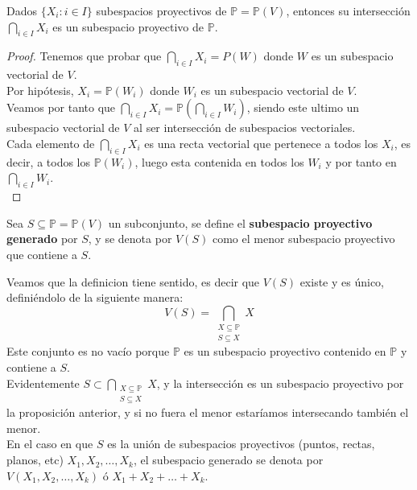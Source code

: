 \begin{proposición}
    Dados $\{X_i : i \in I\}$ subespacios proyectivos de $\mathbb{P} = \mathbb{P}(V)$, entonces su intersección $\bigcap_{i \in I} X_i$ es un subespacio proyectivo de $\mathbb{P}$.\\
\end{proposición}

\begin{proof}
    Tenemos que probar que $\bigcap_{i \in I} X_i = P(W)$ donde $W$ es un subespacio vectorial de $V$.\\
    Por hipótesis, $X_i = \mathbb{P}(W_i)$ donde $W_i$ es un subespacio vectorial de $V$.\\
    Veamos por tanto que $\bigcap_{i \in I} X_i = \mathbb{P}(\bigcap_{i \in I} W_i)$, siendo este ultimo un subespacio vectorial de $V$ al ser intersección de subespacios vectoriales.\\
    Cada elemento de $\bigcap_{i \in I} X_i$ es una recta vectorial que pertenece a todos los $X_i$, es decir, a todos los $\mathbb{P}(W_i)$, luego esta contenida en todos los $W_i$ y por tanto en $\bigcap_{i \in I} W_i$.\\
\end{proof}

\begin{definición}
    Sea $S \subseteq \mathbb{P} = \mathbb{P}(V)$ un subconjunto, se define el \textbf{subespacio proyectivo generado} por $S$, y se denota por $V(S)$ como el menor subespacio proyectivo que contiene a $S$.\\
\end{definición}

Veamos que la definicion tiene sentido, es decir que $V(S)$ existe y es único, definiéndolo de la siguiente manera:
\[
V(S) = \bigcap_{\substack{X \subseteq \mathbb{P} \\ S \subseteq X}} X
\]
Este conjunto es no vacío porque $\mathbb{P}$ es un subespacio proyectivo contenido en $\mathbb{P}$ y contiene a $S$.\\
Evidentemente $S \subset \bigcap_{\substack{X \subseteq \mathbb{P} \\ S \subseteq X}} X$, y la intersección es un subespacio proyectivo por la proposición anterior, y si no fuera el menor estaríamos intersecando también el menor.\\
En el caso en que $S$ es la unión de subespacios proyectivos (puntos, rectas, planos, etc) $X_1, X_2, \ldots, X_k$, el subespacio generado se denota por $V(X_1, X_2, \ldots, X_k)$ ó $X_1 + X_2 + \ldots + X_k$.

